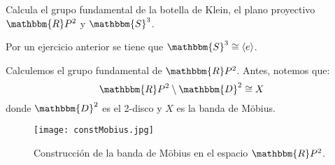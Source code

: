 \documentclass[12pt]{report}
\theoremstyle{largebreak}
\newcommand{\bbm}[1]{\ensuremath{\mathbbm{#1}}}
\newcommand{\gen}[1]{\ensuremath{\langle#1\rangle}}
\begin{document}
    \begin{excer}
        Calcula el grupo fundamental de la botella de Klein, el plano proyectivo $\bbm{R}P^2$ y $\bbm{S}^3$.
    \end{excer}

    \begin{sol}
        Por un ejercicio anterior se tiene que $\bbm{S}^3\cong\gen{e}$.
        
        Calculemos el grupo fundamental de $\bbm{R}P^2$. Antes, notemos que:
        \begin{equation*}
            \bbm{R}P^2\setminus\bbm{D}^2\cong X
        \end{equation*}
        donde $\bbm{D}^2$ es el 2-disco y $X$ es la banda de Möbius.
        \begin{figure}
            \begin{center}
                \texttt{[image: constMobius.jpg]}
            \end{center}
            \caption{Construcción de la banda de Möbius en el espacio $\bbm{R}P^2$.}
        \end{figure}


\end{sol}
\end{document}
